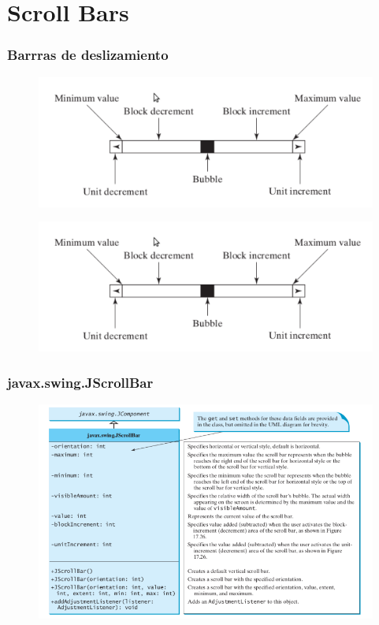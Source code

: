 \documentclass{beamer}
\begin{document}
\section{Scroll Bars}
\begin{frame}[fragile]
\frametitle{Barrras de deslizamiento}
\begin{figure}
\includegraphics[scale=0.7]{imagenes/scroll1.png} 
\end{figure} 
\begin{figure}
\includegraphics[scale=0.7]{imagenes/scroll1.png} 
\end{figure}
\end{frame}

\begin{frame}[fragile]
\frametitle{javax.swing.JScrollBar}
\begin{figure}
\includegraphics[scale=0.55]{imagenes/scroll2.png} 
\end{figure} 
\end{frame}
\end{document}
